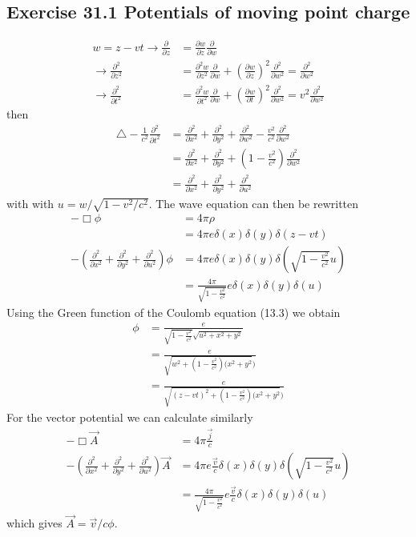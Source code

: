\documentclass[../main.tex]{subfiles}
\begin{document}
\subsection{Exercise 31.1 Potentials of moving point charge}
\begin{align}
    w=z-vt
    \rightarrow
    \frac{\partial}{\partial z}&=\frac{\partial w}{\partial z}\frac{\partial}{\partial w}\\
    \rightarrow\frac{\partial^2}{\partial z^2}&=\frac{\partial^2 w}{\partial z^2}\frac{\partial}{\partial w}+\left(\frac{\partial w}{\partial z}\right)^2\frac{\partial^2}{\partial w^2}=\frac{\partial^2}{\partial w^2}\\
    \rightarrow\frac{\partial^2}{\partial t^2}&=\frac{\partial^2 w}{\partial t^2}\frac{\partial}{\partial w}+\left(\frac{\partial w}{\partial t}\right)^2\frac{\partial^2}{\partial w^2}=v^2\frac{\partial^2}{\partial w^2}
\end{align}
then
\begin{align}
    \triangle-\frac{1}{c^2}\frac{\partial^2}{\partial t^2}&=\frac{\partial^2}{\partial x^2}+\frac{\partial^2}{\partial y^2}+\frac{\partial^2}{\partial w^2}-\frac{v^2}{c^2}\frac{\partial^2}{\partial w^2}\\
    &=\frac{\partial^2}{\partial x^2}+\frac{\partial^2}{\partial y^2}+\left(1-\frac{v^2}{c^2}\right)\frac{\partial^2}{\partial w^2}\\
    &=\frac{\partial^2}{\partial x^2}+\frac{\partial^2}{\partial y^2}+\frac{\partial^2}{\partial u^2}
\end{align}
with with $u=w/\sqrt{1-v^2/c^2}$. The wave equation can then be rewritten
\begin{align}
    -\Box\phi&=4\pi\rho\\
    &=4\pi e\delta(x)\delta(y)\delta(z-vt)\\
    -\left(\frac{\partial^2}{\partial x^2}+\frac{\partial^2}{\partial y^2}+\frac{\partial^2}{\partial u^2}\right)\phi&=4\pi e\delta(x)\delta(y)\delta\left(\sqrt{1-\frac{v^2}{c^2}}u\right)\\
    &=\frac{4\pi}{\sqrt{1-\frac{v^2}{c^2}}} e\delta(x)\delta(y)\delta\left(u\right)
\end{align}
Using the Green function of the Coulomb equation (13.3) we obtain
\begin{align}
    \phi&=\frac{e}{\sqrt{1-\frac{v^2}{c^2}}\sqrt{u^2+x^2+y^2}}\\
    &=\frac{e}{\sqrt{w^2+(1-\frac{v^2}{c^2})(x^2+y^2})}\\
    &=\frac{e}{\sqrt{(z-vt)^2+(1-\frac{v^2}{c^2})(x^2+y^2})}
\end{align}
For the vector potential we can calculate similarly
\begin{align}
    -\Box\vec{A}&=4\pi\frac{\vec{j}}{c}\\
    -\left(\frac{\partial^2}{\partial x^2}+\frac{\partial^2}{\partial y^2}+\frac{\partial^2}{\partial u^2}\right)\vec{A}&=4\pi e\frac{\vec{v}}{c}\delta(x)\delta(y)\delta\left(\sqrt{1-\frac{v^2}{c^2}}u\right)\\
    &=\frac{4\pi}{\sqrt{1-\frac{v^2}{c^2}}} e\frac{\vec{v}}{c}\delta(x)\delta(y)\delta\left(u\right)
\end{align}
which gives $\vec{A}=\vec{v}/c\phi$.
\end{document}
